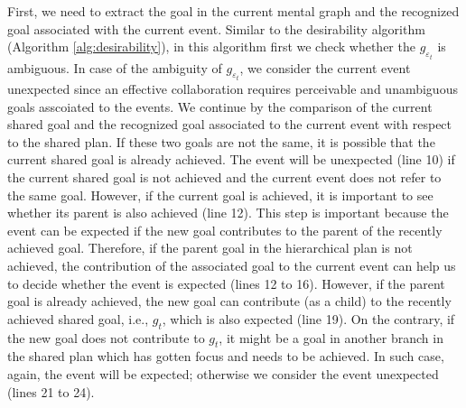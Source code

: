 \documentclass[letterpaper]{article}
\begin{document}
First, we need to extract the goal in the current mental graph and the
recognized goal associated with the current event. Similar to the desirability
algorithm (Algorithm \ref{alg:desirability}), in this algorithm first we check
whether the $\mathit{g}_{\varepsilon_t}$ is ambiguous. In case of the ambiguity
of $\mathit{g}_{\varepsilon_t}$, we consider the current event unexpected since
an effective collaboration requires perceivable and unambiguous goals asscoiated
to the events. We continue by the comparison of the current shared goal and the
recognized goal associated to the current event with respect to the shared plan.
If these two goals are not the same, it is possible that the current shared goal
is already achieved. The event will be unexpected (line 10) if the current
shared goal is not achieved and the current event does not refer to the same
goal. However, if the current goal is achieved, it is important to see whether
its parent is also achieved (line 12). This step is important because the event
can be expected if the new goal contributes to the parent of the recently
achieved goal. Therefore, if the parent goal in the hierarchical plan is not
achieved, the contribution of the associated goal to the current event can help
us to decide whether the event is expected (lines 12 to 16). However, if the
parent goal is already achieved, the new goal can contribute (as a child) to the
recently achieved shared goal, i.e., $\mathit{g}_{t}$, which is also expected
(line 19). On the contrary, if the new goal does not contribute to
$\mathit{g}_{t}$, it might be a goal in another branch in the shared plan which
has gotten focus and needs to be achieved. In such case, again, the event will
be expected; otherwise we consider the event unexpected (lines 21 to 24).
\end{document}
